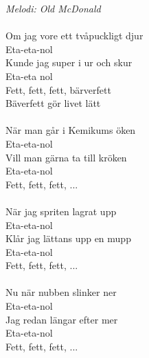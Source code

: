 {\footnotesize\textit{Melodi: Old McDonald}}\\
\\
Om jag vore ett tvåpuckligt djur\\
Eta-eta-nol\\
Kunde jag super i ur och skur\\
Eta-eta nol\\
Fett, fett, fett, bärverfett\\
Bäverfett gör livet lätt\\
\\
När man går i Kemikums öken\\
Eta-eta-nol\\
Vill man gärna ta till kröken\\
Eta-eta-nol\\
Fett, fett, fett, ...\\
\\
När jag spriten lagrat upp\\
Eta-eta-nol\\
Klår jag lättans upp en mupp\\
Eta-eta-nol\\
Fett, fett, fett, ...\\
\\
Nu när nubben slinker ner\\
Eta-eta-nol\\
Jag redan längar efter mer\\
Eta-eta-nol\\
Fett, fett, fett, ...
